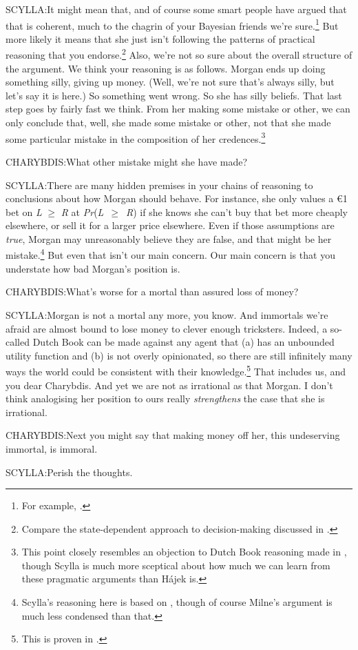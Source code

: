 \begin{hangparas}{.25in}{1}
SCYLLA:It might mean that, and of course some smart people have argued that that is coherent, much to the chagrin of your Bayesian friends we're sure.\footnote{For example, \citet{Shafer1976}.} But more likely it means that she just isn't following the patterns of practical reasoning that you endorse.\footnote{Compare the state-dependent approach to decision-making discussed in \citet{ChambersQuiggin2000}.} Also, we're not so sure about the overall structure of the argument. We think your reasoning is as follows. Morgan ends up doing something silly, giving up money. (Well, we're not sure that's always silly, but let's say it is here.) So something went wrong. So she has silly beliefs. That last step goes by fairly fast we think. From her making some mistake or other, we can only conclude that, well, she made some mistake or other, not that she made some particular mistake in the composition of her credences.\footnote{This point closely resembles an objection to Dutch Book reasoning made in \citet{Hajek2005}, though Scylla is much more sceptical about how much we can learn from these pragmatic arguments than H\'{a}jek is. }

CHARYBDIS:What other mistake might she have made?

SCYLLA:There are many hidden premises in your chains of reasoning to conclusions about how Morgan should behave. For instance, she only values a {\euro}1 bet on \textit{L} ${\geq}$ \textit{R} at \textit{Pr}(\textit{L}~${\geq}$~\textit{R}) if she knows she can't buy that bet more cheaply elsewhere, or sell it for a larger price elsewhere. Even if those assumptions are \textit{true}, Morgan may unreasonably believe they are false, and that might be her mistake.\footnote{Scylla's reasoning here is based on \citet{Milne1991}, though of course Milne's argument is much less condensed than that.} But even that isn't our main concern. Our main concern is that you understate how bad Morgan's position is.

CHARYBDIS:What's worse for a mortal than assured loss of money?

SCYLLA:Morgan is not a mortal any more, you know. And immortals we're afraid are almost bound to lose money to clever enough tricksters. Indeed, a so-called Dutch Book can be made against any agent that (a) has an unbounded utility function and (b) is not overly opinionated, so there are still infinitely many ways the world could be consistent with their knowledge.\footnote{This is proven in \citet{McGee1999}.} That includes us, and you dear Charybdis. And yet we are not as irrational as that Morgan. I don't think analogising her position to ours really \textit{strengthens} the case that she is irrational. 

CHARYBDIS:Next you might say that making money off her, this undeserving immortal, is immoral.

SCYLLA:Perish the thoughts.
\end{hangparas}

